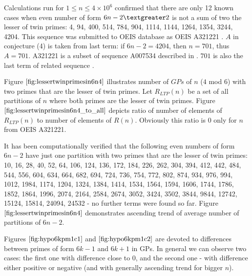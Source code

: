 \documentclass[10pt,twocolumn]{article}
\begin{document}
Calculations run for $1 \leq n \leq 4 \times 10^6$ confirmed that there are only 12 known cases when even number of form $6n-2 \textgreater 2$ is not a sum of two the lesser of twin primes: 4, 94, 400, 514, 784, 904, 1114, 1144, 1264, 1354, 3244, 4204. This sequence was submitted to OEIS database as OEIS A321221 \cite{A321221}. $A$ in conjecture (4) is taken from last term: if $6n-2=4204$, then $n=701$, thus $A = 701$. A321221 is a subset of sequence A007534 \cite{A007534} described in \cite{zwillinger1979}. $701$ is also the last term of related sequence \cite{A243956}.\par

Figure $\ref{fig:lessertwinprimesin6n4}$ illustrates number of $GPs$ of $n$ ($4$ mod $6$) with two primes that are the lesser of twin primes. Let $R_{LTP}(n)$ be a set of all partitions of $n$ where both primes are the lesser of twin primes. Figure $\ref{fig:lessertwinprimesin6n4_to_all}$ depicts ratio of number of elements of $R_{LTP}(n)$ to number of elements of $R(n)$. Obviously this ratio is $0$ only for $n$ from OEIS A321221.\par

 It has been computationally verified that the following even numbers of form $6n-2$ have just one partition with two primes that are the lesser of twin primes: 10, 16, 28, 40, 52, 64, 106, 124, 136, 172, 184, 226, 262, 304, 394, 412, 442, 484, 544, 556, 604, 634, 664, 682, 694, 724, 736, 754, 772, 802, 874, 934, 976, 994, 1012, 1984, 1174, 1204, 1324, 1384, 1414, 1534, 1564, 1594, 1606, 1744, 1786, 1852, 1864, 1996, 2074, 2164, 2584, 2674, 3052, 3424, 3502, 3844, 9844, 12742, 15124, 15814, 24094, 24532 - no further terms were found so far. Figure $\ref{fig:lessertwinprimesin6n4}$ demonstrates ascending trend of average number of partitions of $6n-2$. \par
 
 Figures $\ref{fig:hypo6kpm1c1}$ and $\ref{fig:hypo6kpm1c2}$ are devoted to differences between primes of form $6k-1$ and $6k+1$ in GPs. In general we can observe two cases: the first one with difference close to 0, and the second one - with difference either positive or negative (and with generally ascending trend for bigger $n$).
\end{document}

